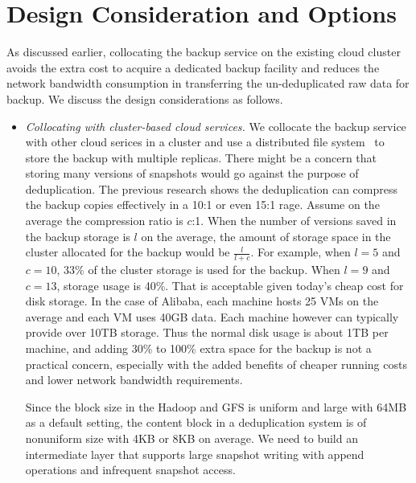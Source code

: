 \section{Design Consideration and Options}
\label{sect:options}

As discussed earlier, collocating the backup service on the existing
cloud cluster avoids the extra cost to acquire a dedicated backup facility
and reduces the network bandwidth consumption in transferring the un-deduplicated
raw data for backup. 
We discuss the design considerations as follows. 

\begin{itemize}
\item {\em Collocating with cluster-based cloud services.}
We collocate the backup service with other cloud serices in a cluster
and use a distributed file system~\cite{GFS2004,Hadoop} to 
store the backup with multiple replicas. 
There might be a concern that storing many versions of snapshots would
go against the purpose of deduplication.
The previous research shows the deduplication can compress the backup copies 
effectively in a 10:1 or even 15:1 rage. Assume on the average the compression
ratio is $c$:1.  When the number of versions
saved in the backup storage is $l$  on the average, 
the amount of storage space in the cluster allocated  for the backup would be $\frac{l}{l+c}$.
For example, when $l=5$ and $c=10$, 33\% of the cluster storage is used for the backup.
When $l=9$ and $c=13$, storage usage is 40\%. 
That is acceptable given today's cheap cost for disk storage.
In the case of Alibaba, each machine hosts 25 VMs on the average and each VM uses 40GB data.
Each machine however can typically provide over 10TB storage.
Thus the normal disk usage  is about 1TB per machine, and adding 30\% to 100\% 
extra space for the backup is not a practical concern, especially with the
added benefits of cheaper running costs and lower network bandwidth requirements.

Since the block size in the Hadoop and GFS is uniform and large with 64MB as a default setting,
the content block in a deduplication system is of nonuniform size with 4KB or 8KB on average.
We need to build an intermediate layer that supports large snapshot writing with append operations
and infrequent snapshot access.


\end{itemize}
